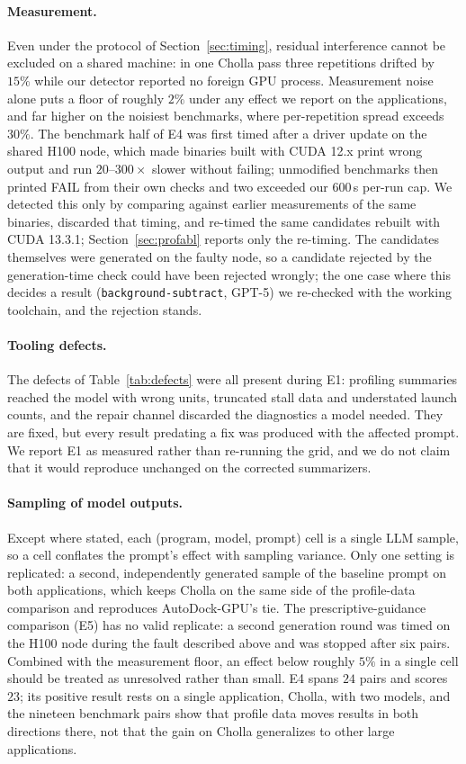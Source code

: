 \paragraph{Measurement.}
Even under the protocol of Section~\ref{sec:timing}, residual interference cannot be excluded on a
shared machine: in one Cholla pass three repetitions drifted by $15\%$ while our detector reported no
foreign GPU process. Measurement noise alone puts a floor of roughly $2\%$ under any effect we report on
the applications, and far higher on the noisiest benchmarks, where per-repetition spread exceeds
$30\%$. The benchmark half of E4 was first timed after a driver update on the shared H100 node, which
made binaries built with CUDA 12.x print wrong output and run $20$--$300\times$ slower without failing;
unmodified benchmarks then printed FAIL from their own checks and two exceeded our $600$\,s per-run cap.
We detected this only by comparing against earlier measurements of the same binaries, discarded that
timing, and re-timed the same candidates rebuilt with CUDA 13.3.1; Section~\ref{sec:profabl} reports
only the re-timing. The candidates themselves were generated on the faulty node, so a candidate
rejected by the generation-time check could have been rejected wrongly; the one case where this decides
a result (\texttt{background-subtract}, GPT-5) we re-checked with the working toolchain, and the
rejection stands.

\paragraph{Tooling defects.}
The defects of Table~\ref{tab:defects} were all present during E1: profiling summaries reached the
model with wrong units, truncated stall data and understated launch counts, and the repair channel
discarded the diagnostics a model needed. They are fixed, but every result predating a fix was produced
with the affected prompt. We report E1 as measured rather than re-running the grid, and we do not claim
that it would reproduce unchanged on the corrected summarizers.

\paragraph{Sampling of model outputs.}
Except where stated, each (program, model, prompt) cell is a single LLM sample, so a cell conflates the
prompt's effect with sampling variance. Only one setting is replicated: a second, independently
generated sample of the baseline prompt on both applications, which keeps Cholla on the same side of
the profile-data comparison and reproduces AutoDock-GPU's tie. The prescriptive-guidance comparison
(E5) has no valid replicate: a second generation round was timed on the H100 node during the fault
described above and was stopped after six pairs. Combined with the measurement floor, an effect below
roughly $5\%$ in a single cell should be treated as unresolved rather than small. E4 spans $24$ pairs
and scores $23$; its positive result rests on a single application, Cholla, with two models, and the
nineteen benchmark pairs show that profile data moves results in both directions there, not that the
gain on Cholla generalizes to other large applications.

